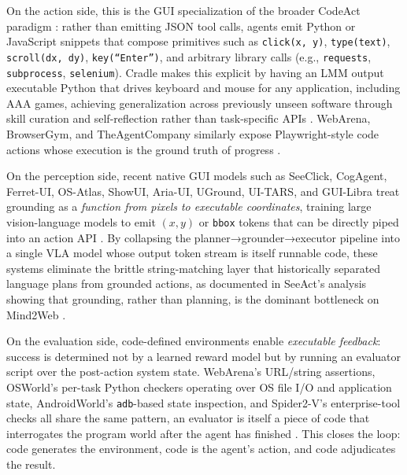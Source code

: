 On the action side, this is the GUI specialization of the broader CodeAct paradigm \citep{wang2024executablecodeactionselicit}: rather than emitting JSON tool calls, agents emit Python or JavaScript snippets that compose primitives such as \texttt{click(x, y)}, \texttt{type(text)}, \texttt{scroll(dx, dy)}, \texttt{key(``Enter'')}, and arbitrary library calls (e.g., \texttt{requests}, \texttt{subprocess}, \texttt{selenium}). Cradle makes this explicit by having an LMM output executable Python that drives keyboard and mouse for any application, including AAA games, achieving generalization across previously unseen software through skill curation and self-reflection rather than task-specific APIs \citep{tan2024cradleempoweringfoundationagents}. WebArena, BrowserGym, and TheAgentCompany similarly expose Playwright-style code actions whose execution is the ground truth of progress \citep{zhou2024webarenarealisticwebenvironment,drouin2024workarenacapablewebagents,xu2025theagentcompanybenchmarkingllmagents}.

On the perception side, recent native GUI models such as SeeClick, CogAgent, Ferret-UI, OS-Atlas, ShowUI, Aria-UI, UGround, UI-TARS, and GUI-Libra treat grounding as a \textit{function from pixels to executable coordinates}, training large vision-language models to emit $(x, y)$ or \texttt{bbox} tokens that can be directly piped into an action API \citep{cheng2024seeclickharnessingguigrounding,hong2024cogagentvisuallanguagemodel,you2024ferretuigroundedmobileui,wu2024osatlasfoundationactionmodel,lin2024showuivisionlanguageactionmodelgui,yang2025ariauivisualgroundinggui,gou2025navigatingdigitalworldhumans,qin2025uitarspioneeringautomatedgui,yang2026guilibratrainingnativegui}. By collapsing the planner→grounder→executor pipeline into a single VLA model whose output token stream is itself runnable code, these systems eliminate the brittle string-matching layer that historically separated language plans from grounded actions, as documented in SeeAct's analysis showing that grounding, rather than planning, is the dominant bottleneck on Mind2Web \citep{zheng2024gpt4visiongeneralistwebagent}.

On the evaluation side, code-defined environments enable \textit{executable feedback}: success is determined not by a learned reward model but by running an evaluator script over the post-action system state. WebArena's URL/string assertions, OSWorld's per-task Python checkers operating over OS file I/O and application state, AndroidWorld's \texttt{adb}-based state inspection, and Spider2-V's enterprise-tool checks all share the same pattern, an evaluator is itself a piece of code that interrogates the program world after the agent has finished \citep{zhou2024webarenarealisticwebenvironment,xie2024osworldbenchmarkingmultimodalagents,rawles2025androidworlddynamicbenchmarkingenvironment,cao2024spider2vfarmultimodalagents}. This closes the loop: code generates the environment, code is the agent's action, and code adjudicates the result.

